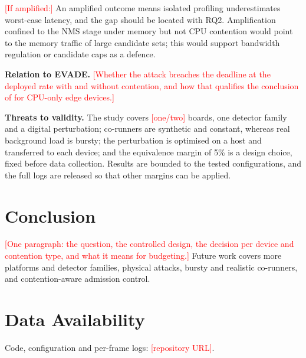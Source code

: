 \documentclass[conference]{IEEEtran}
\newcommand{\TODO}[1]{\textcolor{red}{[#1]}}
\begin{document}
\TODO{If amplified:} An amplified outcome means isolated profiling underestimates worst-case
latency, and the gap should be located with RQ2. Amplification confined to the NMS stage under
memory but not CPU contention would point to the memory traffic of large candidate sets; this
would support bandwidth regulation \cite{ali2018bwlock} or candidate caps as a defence.

\textbf{Relation to EVADE.} \TODO{Whether the attack breaches the deadline at the deployed rate
with and without contention, and how that qualifies the conclusion of \cite{monteuuis2025evade}
for CPU-only edge devices.}

\textbf{Threats to validity.} The study covers \TODO{one/two} boards, one detector family and a
digital perturbation; co-runners are synthetic and constant, whereas real background load is
bursty; the perturbation is optimised on a host and transferred to each device; and the equivalence
margin of 5\% is a design choice, fixed before data collection. Results are bounded to the tested
configurations, and the full logs are released so that other margins can be applied.

\section{Conclusion}
\TODO{One paragraph: the question, the controlled design, the decision per device and contention
type, and what it means for budgeting.} Future work covers more platforms and detector families,
physical attacks, bursty and realistic co-runners, and contention-aware admission control.

\section*{Data Availability}
Code, configuration and per-frame logs: \TODO{repository URL}.



\end{document}
